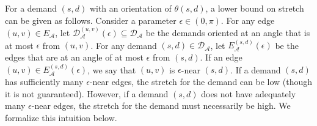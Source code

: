 \documentclass[acmsmall, screen]{acmart}
\begin{document}
For a demand $(s, d)$ with an orientation of $\theta(s, d)$, a lower bound on stretch can be given as follows.  
Consider a parameter $\epsilon \in (0, \pi)$. 
For any edge $(u, v) \in E_\mathcal{A}$, let $\mathcal{D}_{\mathcal{A}}^{(u, v)}(\epsilon) \subseteq \mathcal{D}_{\mathcal{A}}$ be the demands oriented at an angle that is at most $\epsilon$ from $(u, v)$. 
For any demand $(s, d) \in \mathcal{D}_{\mathcal{A}}$, let $E_\mathcal{A}^{(s,d)}(\epsilon)$ be the edges that are at an angle of at most $\epsilon$ from $(s, d)$. 
If an edge $(u, v) \in E_\mathcal{A}^{(s,d)}(\epsilon)$, we say that $(u,v)$ is $\epsilon$-near $(s,d)$. 
If a demand $(s,d)$ has sufficiently many $\epsilon$-near edges, the stretch for the demand can be low (though it is not guaranteed).
However, if a demand $(s, d)$ does not have adequately many $\epsilon$-near edges, the stretch for the demand must necessarily be high. 
We formalize this intuition below. 
\end{document}
